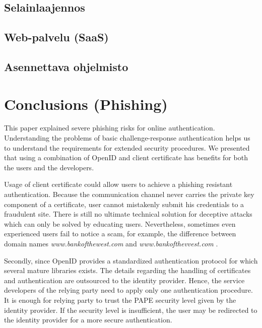 \documentclass[english,gradu]{tktltiki}
\begin{document}
\subsection{Selainlaajennos} %
\label{sub:selainlaajennokset}


\subsection{Web-palvelu (SaaS)} %
\label{sub:web_palvelut_saas_}


\subsection{Asennettava ohjelmisto} %
\label{sub:asennettava_ohjelmist}





\section{Conclusions (Phishing)} %
\label{sec:conclusions_phishing_}

                 This paper explained severe phishing risks for online authentication. Understanding the problems of basic challenge-response authentication helps us to understand the requirements for extended security procedures. We presented that using a combination of OpenID and client certificate has benefits for both the users and the developers.

                 Usage of client certificate could allow users to achieve a phishing resistant authentication. Because the communication channel never carries the private key component of a certificate, user cannot mistakenly submit his credentials to a fraudulent site. There is still no ultimate technical solution for deceptive attacks which can only be solved by educating users. Nevertheless, sometimes even experienced users fail to notice a scam, for example, the difference between domain names
           \emph{www.bankofthewest.com} and \emph{www.bankofthevvest.com} \cite{why_phishing_works_06}.

                 Secondly, since OpenID provides a standardized authentication protocol for which several mature libraries exists. The details regarding the handling of certificates and authentication are outsourced to the identity provider. Hence, the service developers of the relying party need to apply only one authentication procedure. It is enough for relying party to trust the PAPE security level given by the identity provider. If the security level is insufficient, the user may be redirected to the identity provider for a more secure authentication.
\end{document}
